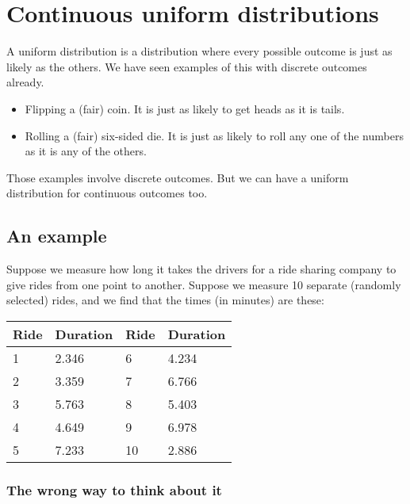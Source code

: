 \documentclass[../../../main.tex]{subfiles}
\begin{document}
\chapter{Continuous uniform distributions}

A uniform distribution is a distribution where every possible outcome is just as likely as the others. We have seen examples of this with discrete outcomes already. 

\begin{itemize}
  \item Flipping a (fair) coin. It is just as likely to get heads as it is tails.
  \item Rolling a (fair) six-sided die. It is just as likely to roll any one of the numbers as it is any of the others.
\end{itemize}

\noindent
Those examples involve discrete outcomes. But we can have a uniform distribution for continuous outcomes too. 


\section{An example}

Suppose we measure how long it takes the drivers for a ride sharing company to give rides from one point to another. Suppose we measure 10 separate (randomly selected) rides, and we find that the times (in minutes) are these:

\begin{center}
  \begin{tabular}{|| l | l || l | l |}
    \hline
    \textbf{Ride} & \textbf{Duration} & \textbf{Ride} & \textbf{Duration} \\ \hline
    1 & 2.346 & 6 & 4.234 \\ \hline
    2 & 3.359 & 7 & 6.766 \\ \hline
    3 & 5.763 & 8 & 5.403 \\ \hline
    4 & 4.649 & 9 & 6.978 \\ \hline
    5 & 7.233 & 10 & 2.886 \\ \hline
  \end{tabular}
\end{center}


\subsection{The wrong way to think about it}
\end{document}
